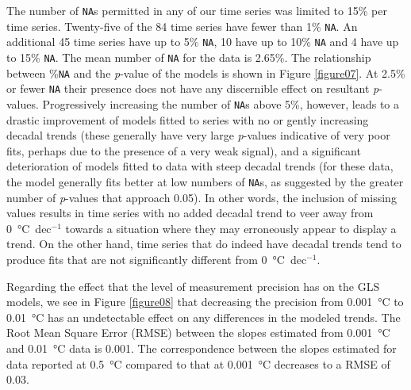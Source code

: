 \documentclass[]{ametsoc}
\begin{document}
The number of \texttt{NA}s permitted in any of our time series was limited to 15\% per time series. Twenty-five of the 84 time series have fewer than 1\% \texttt{NA}. An additional 45 time series have up to 5\% \texttt{NA}, 10 have up to 10\% \texttt{NA} and 4 have up to 15\% \texttt{NA}. The mean number of \texttt{NA} for the data is 2.65\%. The relationship between \%\texttt{NA} and the \emph{p}-value of the models is shown in Figure \ref{figure07}. At 2.5\% or fewer \texttt{NA} their presence does not have any discernible effect on resultant \emph{p}-values. Progressively increasing the number of \texttt{NA}s above 5\%, however, leads to a drastic improvement of models fitted to series with no or gently increasing decadal trends (these generally have very large \emph{p}-values indicative of very poor fits, perhaps due to the presence of a very weak signal), and a significant deterioration of models fitted to data with steep decadal trends (for these data, the model generally fits better at low numbers of \texttt{NA}s, as suggested by the greater number of \emph{p}-values that approach 0.05). In other words, the inclusion of missing values results in time series with no added decadal trend to veer away from \SI{0}{\degreeCelsius}~dec$^{-1}$ towards a situation where they may erroneously appear to display a trend. On the other hand, time series that do indeed have decadal trends tend to produce fits that are not significantly different from \SI{0}{\degreeCelsius}~dec$^{-1}$.

Regarding the effect that the level of measurement precision has on the GLS models, we see in Figure \ref{figure08} that decreasing the precision from \SI{0.001}{\degreeCelsius} to \SI{0.01}{\degreeCelsius} has an undetectable effect on any differences in the modeled trends. The Root Mean Square Error (RMSE) between the slopes estimated from \SI{0.001}{\degreeCelsius} and \SI{0.01}{\degreeCelsius} data is 0.001. The correspondence between the slopes estimated for data reported at \SI{0.5}{\degreeCelsius} compared to that at \SI{0.001}{\degreeCelsius} decreases to a RMSE of 0.03.
\end{document}
